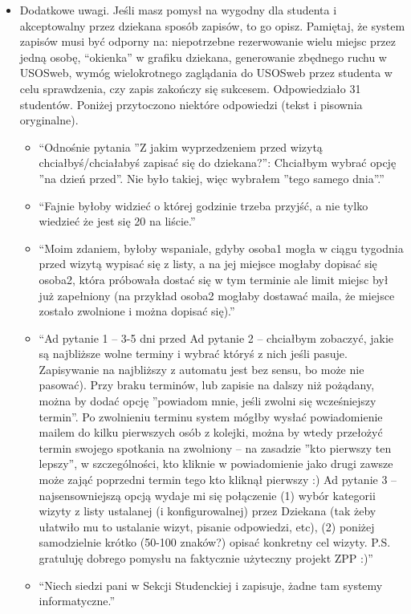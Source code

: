 \documentclass[licencjacka]{pracamgr}
\begin{document}
\begin{itemize}
\item Dodatkowe uwagi. Jeśli masz pomysł na wygodny dla studenta i akceptowalny przez dziekana sposób zapisów, to go opisz. Pamiętaj, że system zapisów musi być odporny na: niepotrzebne rezerwowanie wielu miejsc przez jedną osobę, \enquote{okienka} w grafiku dziekana, generowanie zbędnego ruchu w USOSweb, wymóg wielokrotnego zaglądania do USOSweb przez studenta w celu sprawdzenia, czy zapis zakończy się sukcesem.
Odpowiedziało 31 studentów. Poniżej przytoczono niektóre odpowiedzi (tekst i pisownia oryginalne).
\begin{itemize}
\setlength\itemsep{0,1em}
\item \enquote{Odnośnie pytania ''Z jakim wyprzedzeniem przed wizytą chciałbyś/chciałabyś zapisać się do dziekana?'':    Chciałbym wybrać opcję ''na dzień przed''. Nie było takiej, więc wybrałem ''tego samego dnia''.}
\item \enquote{Fajnie byłoby widzieć o której godzinie trzeba przyjść, a nie tylko wiedzieć że jest się 20 na liście.}
\item \enquote{Moim zdaniem, byłoby wspaniale, gdyby osoba1 mogła w ciągu tygodnia przed wizytą wypisać się z listy, a na jej miejsce mogłaby dopisać się osoba2, która próbowała dostać się w tym terminie ale limit miejsc był już zapełniony (na przykład osoba2 mogłaby dostawać maila, że miejsce zostało zwolnione i można dopisać się).}
\item \enquote{Ad pytanie 1 -- 3-5 dni przed    Ad pytanie 2 -- chciałbym zobaczyć, jakie są najbliższe wolne terminy i wybrać któryś z nich jeśli pasuje. Zapisywanie na najbliższy z automatu jest bez sensu, bo może nie pasować). Przy braku terminów, lub zapisie na dalszy niż pożądany, można by dodać opcję ''powiadom mnie, jeśli zwolni się wcześniejszy termin''. Po zwolnieniu terminu system mógłby wysłać powiadomienie mailem do kilku pierwszych osób z kolejki, można by wtedy przełożyć termin swojego spotkania na zwolniony -- na zasadzie ''kto pierwszy ten lepszy'', w szczególności, kto kliknie w powiadomienie jako drugi zawsze może zająć poprzedni termin tego kto kliknął pierwszy :)    Ad pytanie 3 -- najsensowniejszą opcją wydaje mi się połączenie    (1) wybór kategorii wizyty z listy ustalanej (i konfigurowalnej) przez Dziekana (tak żeby ułatwiło mu to ustalanie wizyt, pisanie odpowiedzi, etc),    (2) poniżej samodzielnie krótko (50-100 znaków?) opisać konkretny cel wizyty.    P.S. gratuluję dobrego pomysłu na faktycznie użyteczny projekt ZPP :)}
\item \enquote{Niech siedzi pani w Sekcji Studenckiej i zapisuje, żadne tam systemy informatyczne.}

\end{itemize}
\end{itemize}
\end{document}
